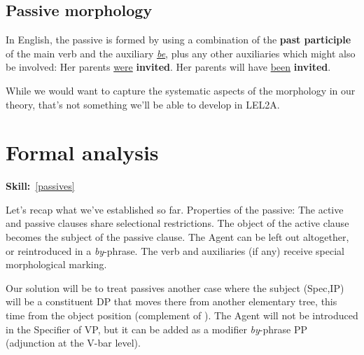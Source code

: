 \documentclass{article}
\begin{document}
    \subsection{Passive morphology}
In English, the passive is formed by using a combination of the \textbf{past participle} of the main verb and the auxiliary \uline{\emph{be}}, plus any other auxiliaries which might also be involved:
\ea
    \ea Her parents \uline{were} \textbf{invited}.
    \ex Her parents will have \uline{been} \textbf{invited}.
    \z
\z

While we would want to capture the systematic aspects of the morphology in our theory, that's not something we'll be able to develop in LEL2A.

\section{Formal analysis}
\hfill{}\textbf{Skill:}~\ref{passives}

Let's recap what we've established so far.
\ea Properties of the passive:
    \ea The active and passive clauses share selectional restrictions.
    \ex The object of the active clause becomes the subject of the passive clause.
    \ex The Agent can be left out altogether, or reintroduced in a \emph{by}-phrase.
    \ex The verb and auxiliaries (if any) receive special morphological marking.
    \z
\z

Our solution will be to treat passives another case where the subject (Spec,IP) will be a constituent DP that moves there from another elementary tree, this time from the object position (complement of ). The Agent will not be introduced in the Specifier of VP, but it can be added as a modifier \emph{by}-phrase PP (adjunction at the V-bar level).
\end{document}
